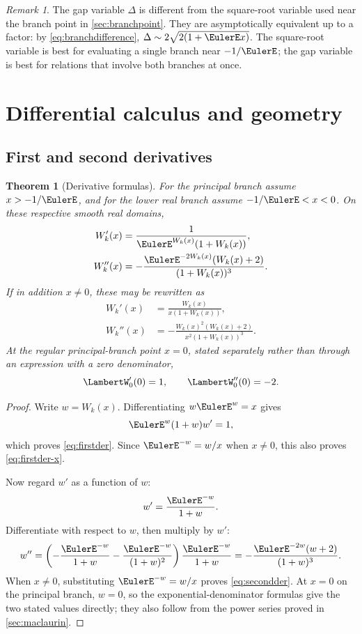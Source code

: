 \documentclass[11pt]{article}
\newtheorem{theorem}{Theorem}[section]
\theoremstyle{remark}
\newtheorem{remark}[remark]{Remark}
\newcommand{\Wz}{\LambertW_{0}}
\begin{document}
\begin{remark}
The gap variable \(\Delta\) is different from the square-root variable used
near the branch point in \cref{sec:branchpoint}.  They are asymptotically
equivalent up to a factor: by \eqref{eq:branchdifference},
\(\Delta\sim2\sqrt{2(1+\EulerE x)}\).  The square-root variable is best for
evaluating a single branch near \(-1/\EulerE\); the gap variable is best for
relations that involve both branches at once.
\end{remark}

\section{Differential calculus and geometry}\label{sec:calculus}

\subsection{First and second derivatives}

\begin{theorem}[Derivative formulas]\label{thm:derivatives}
For the principal branch assume \(x>-1/\EulerE\), and for the lower real
branch assume \(-1/\EulerE<x<0\).  On these respective smooth real domains,
\begin{align}
 W_k'(x)
   &=\frac{1}{\EulerE^{W_k(x)}(1+W_k(x))},\label{eq:firstder}\\
 W_k''(x)
   &=-\frac{\EulerE^{-2W_k(x)}(W_k(x)+2)}
              {(1+W_k(x))^3}.\label{eq:secondder-exp}
\end{align}
If in addition \(x\neq0\), these may be rewritten as
\begin{align}
 W_k'(x)
   &=\frac{W_k(x)}{x(1+W_k(x))},\label{eq:firstder-x}\\
 W_k''(x)
   &=-\frac{W_k(x)^2(W_k(x)+2)}
              {x^2(1+W_k(x))^3}.\label{eq:secondder}
\end{align}
At the regular principal-branch point \(x=0\), stated separately rather
than through an expression with a zero denominator,
\[
 \Wz'(0)=1,\qquad \Wz''(0)=-2.
\]
\end{theorem}

\begin{proof}
Write \(w=W_k(x)\).  Differentiating \(w\EulerE^w=x\) gives
\[
 \EulerE^w(1+w)w'=1,
\]
which proves \eqref{eq:firstder}.  Since \(\EulerE^{-w}=w/x\) when
\(x\neq0\), this also proves \eqref{eq:firstder-x}.

Now regard \(w'\) as a function of \(w\):
\[
       w'=\frac{\EulerE^{-w}}{1+w}.
\]
Differentiate with respect to \(w\), then multiply by \(w'\):
\[
 w''=\left(-\frac{\EulerE^{-w}}{1+w}
           -\frac{\EulerE^{-w}}{(1+w)^2}\right)
           \frac{\EulerE^{-w}}{1+w}
     =-\frac{\EulerE^{-2w}(w+2)}{(1+w)^3}.
\]
When \(x\neq0\), substituting \(\EulerE^{-w}=w/x\) proves
\eqref{eq:secondder}.
At \(x=0\) on the principal branch, \(w=0\), so the exponential-denominator
formulas give the two stated values directly; they also follow from the power
series proved in \cref{sec:maclaurin}.
\end{proof}
\end{document}
